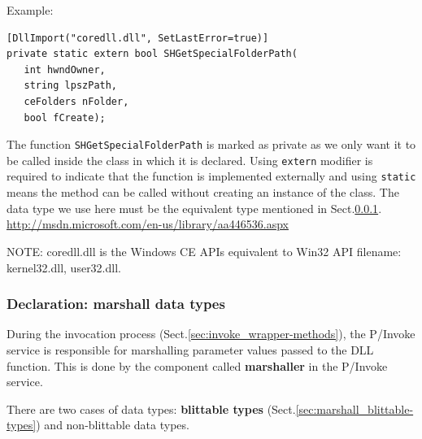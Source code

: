 
Example:
\begin{verbatim}
[DllImport("coredll.dll", SetLastError=true)]
private static extern bool SHGetSpecialFolderPath(
   int hwndOwner, 
   string lpszPath,
   ceFolders nFolder,
   bool fCreate);
\end{verbatim} 
The function \verb!SHGetSpecialFolderPath! is marked as private as we only want
it to be called inside the class in which it is declared. Using \verb!extern!
modifier is required to indicate that the function is implemented externally
and using \verb!static! means the method can be called without creating an
instance of the class. The data type we use here must be the equivalent type
mentioned in Sect.\ref{sec:marshal_types}.
\url{http://msdn.microsoft.com/en-us/library/aa446536.aspx}

\begin{mdframed}
NOTE: coredll.dll is the Windows CE APIs equivalent to Win32 API filename: 
kernel32.dll, user32.dll.
\end{mdframed}




% 



\subsubsection{Declaration: marshall data types}
\label{sec:marshal_types}

During the invocation process (Sect.\ref{sec:invoke_wrapper-methods}), the
P/Invoke service is responsible for marshalling parameter values passed to the
DLL function. This is done by the component called {\bf marshaller} in the
P/Invoke service. 

There are two cases of data types: {\bf blittable types}
(Sect.\ref{sec:marshall_blittable-types}) and non-blittable data types.

